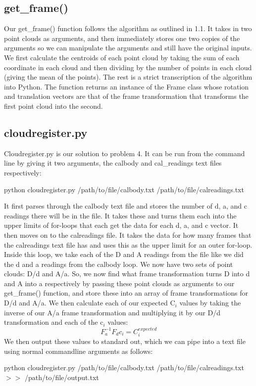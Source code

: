 \documentclass[a4paper]{article}
\begin{document}
\subsection{get\_frame()}
Our get\_frame() function follows the algorithm as outlined in 1.1. It takes in two point clouds as arguments, and then immediately stores one two copies of the arguments so we can manipulate the arguments and still have the original inputs. We first calculate the centroids of each point cloud by taking the sum of each coordinate in each cloud and then dividing by the number of points in each cloud (giving the mean of the points). The rest is a strict transcription of the algorithm into Python. The function returns an instance of the Frame class whose rotation and translation vectors are that of the frame transformation that transforms the first point cloud into the second.

\subsection{cloudregister.py}
Cloudregister.py is our solution to problem 4. It can be run from the command line by giving it two arguments, the calbody and cal\_readings text files respectively: \break
\begin{center}
python cloudregister.py /path/to/file/calbody.txt /path/to/file/calreadings.txt \break
\end{center}
It first parses through the calbody text file and stores the number of d, a, and c readings there will be in the file. It takes these and turns them each into the upper limits of for-loops that each get the data for each d, a, and c vector.
It then moves on to the calreadings file. It takes the data for how many frames that the calreadings text file has and uses this as the upper limit for an outer for-loop. Inside this loop, we take each of the D and A readings from the file like we did the d and a readings from the calbody loop. We now have two sets of point clouds: D/d and A/a. So, we now find what frame transformation turns D into d and A into a respectively by passing these point clouds as arguments to our get\_frame() function, and store these into an array of frame transformations for D/d and A/a.
We then calculate each of our expected C$_i$ values by taking the inverse of our A/a frame transformation and multiplying it by our D/d transformation and each of the c$_i$ values:
\[F_a^{-1}F_dc_i = C_i^{expected}\]
We then output these values to standard out, which we can pipe into a text file using normal commandline arguments as follows:
\begin{center}
python cloudregister.py /path/to/file/calbody.txt /path/to/file/calreadings.txt $>>$ /path/to/file/output.txt
\end{center}
\end{document}
